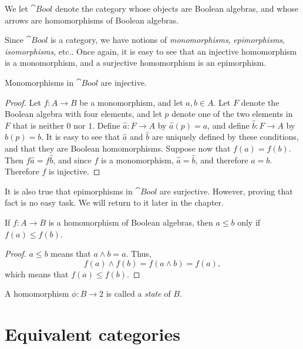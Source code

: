 \begin{defn} We let $\cat{Bool}$ denote the category whose objects are
  Boolean algebras, and whose arrows are homomorphisms of Boolean
  algebras. \end{defn}

Since $\cat{Bool}$ is a
category, we have notions of \emph{monomorphisms},
\emph{epimorphisms}, \emph{isomorphisms}, etc..  Once again, it is
easy to see that an injective homomorphism is a monomorphism, and a
surjective homomorphism is an epimorphism.

\begin{prop} Monomorphisms in $\cat{Bool}$ are injective.  \end{prop}

\begin{proof} Let $f:A\to B$ be a monomorphism, and let $a,b\in A$.
  Let $F$ denote the Boolean algebra with four elements, and let $p$
  denote one of the two elements in $F$ that is neither $0$ nor $1$.
  Define $\hat{a}:F\to A$ by $\hat{a}(p)=a$, and define $\hat{b}:F\to
  A$ by $\hat{b}(p)=b$.  It is easy to see that $\hat{a}$ and
  $\hat{b}$ are uniquely defined by these conditions, and that they
  are Boolean homomorphisms.  Suppose now that $f(a)=f(b)$.  Then
  $f\hat{a}=f\hat{b}$, and since $f$ is a monomorphism,
  $\hat{a}=\hat{b}$, and therefore $a=b$.  Therefore $f$ is injective.
\end{proof}

It is also true that epimorphisms in $\cat{Bool}$ are surjective.
However, proving that fact is no easy task.  We will return to it
later in the chapter.

\begin{prop} If $f:A\to B$ is a homomorphism of Boolean algebras, then
  $a\leq b$ only if $f(a)\leq f(b)$. \end{prop}

\begin{proof} $a\leq b$ means that $a\wedge b=a$.  Thus, 
\[ 
f(a)\wedge f(b) = f(a\wedge b) = f(a) ,\] which means that $f(a)\leq
f(b)$. \end{proof}

\begin{defn} A homomorphism $\phi :B\to 2$ is called a \emph{state} of
  $B$. \end{defn}


\section{Equivalent categories}


